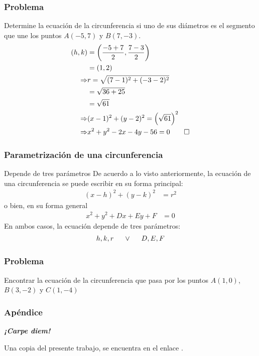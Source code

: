 \documentclass[12pt,spanish,x11names]{beamer}
\def\talktitle{La circunferencia}
\def\talkpubpdf{}
\newcommand{\framedhref}[2]{\href{#1}{\fcolorbox{bluu}{bluu}{\textcolor{white}{#2}}}}
\begin{document}
\begin{frame}
  \frametitle{Problema}
  \begin{exampleblock}{Determine la ecuación de la circunferencia si uno de sus
      diámetros es el segmento que une los puntos  $A(-5,7)$ y $B(7,-3)$.}
    \pause
    \begin{align*}
      (h,k)&=\left(\frac{-5+7}{2},\frac{7-3}{2}\right)\\
      &=(1,2)\\
      \Rightarrow&r=\sqrt{(7-1)^2+(-3-2)^2}\\
       &=\sqrt{36+25}\\
      &=\sqrt{61}\\
      \Rightarrow&(x-1)^2+(y-2)^2=\left(\sqrt{61}\right)^2\\
      \Rightarrow&x^2+y^2-2x-4y-56=0\qed
    \end{align*}
  \end{exampleblock}
\end{frame}
\begin{frame}
  \frametitle{Parametrización de una circunferencia}
  \begin{block}{Depende de tres parámetros}
    De acuerdo a lo visto anteriormente, la ecuación de una circunferencia se
    puede escribir en su \alert{forma principal}:
    \begin{align*}
      (x-h)^2+(y-k)^2&=r^2
    \end{align*}
    o bien, en su \alert{forma general}
    \begin{align*}
      x^2+y^2+Dx+Ey+F&=0
    \end{align*}
    En ambos casos, la ecuación depende de \alert{tres parámetros}:
    \begin{align*}
      h,k,r\hspace{.5cm}\vee\hspace{.5cm} D,E,F
    \end{align*}
  \end{block}
\end{frame}
\begin{frame}
  \frametitle{Problema}
  \begin{exampleblock}{Encontrar la ecuación de la circunferencia que pasa por
      los puntos $A(1,0)$, $B(3,-2)$ y $C(1,-4)$}
    
  \end{exampleblock}
\end{frame}
\begin{frame}[c]\frametitle{Apéndice}
\centering\decofourleft\quad\decofourright

\textbf{\emph {¡Carpe diem!}}

Una copia del presente trabajo, se encuentra en el enlace \framedhref{\talkpubpdf}{\talktitle}.
\end{frame}
\end{document}
